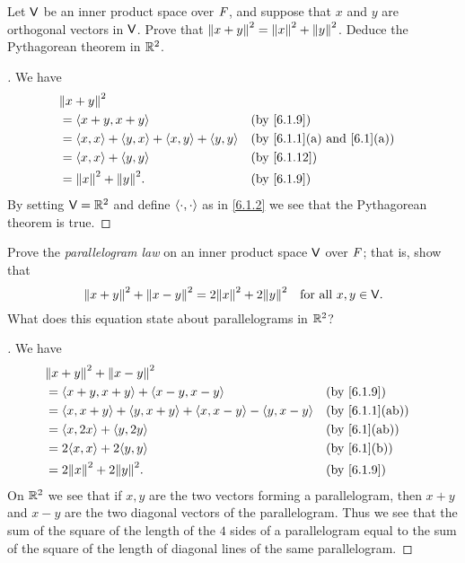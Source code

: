 \begin{ex}\label{ex:6.1.10}
	Let \(\mathsf{V}\) be an inner product space over \(\mathit{F}\), and suppose that \(x\) and \(y\) are orthogonal vectors in \(\mathsf{V}\).
	Prove that \(\left\lVert x + y\right\rVert^2 = \left\lVert x\right\rVert^2 + \left\lVert y\right\rVert^2\).
	Deduce the Pythagorean theorem in \(\mathbb{R}^2\).
\end{ex}

\begin{proof}[]
	We have
	\begin{align*}
		 & \norm{x + y}^2                                                                                         \\
		 & = \inn{x + y, x + y}                                &  & \by{6.1.9}                                    \\
		 & = \inn{x, x} + \inn{y, x} + \inn{x, y} + \inn{y, y} &  & \text{(by \cref{6.1.1}(a) and \cref{6.1}(a))} \\
		 & = \inn{x, x} + \inn{y, y}                           &  & \by{6.1.12}                                   \\
		 & = \norm{x}^2 + \norm{y}^2.                          &  & \by{6.1.9}
	\end{align*}
	By setting \(\mathsf{V} = \mathbb{R}^2\) and define \(\left\langle\cdot, \cdot\right\rangle\) as in \cref{6.1.2} we see that the Pythagorean theorem is true.
\end{proof}

\begin{ex}\label{ex:6.1.11}
	Prove the \emph{parallelogram law} on an inner product space \(\mathsf{V}\) over \(\mathit{F}\);
	that is, show that
	\[
		\norm{x + y}^2 + \norm{x - y}^2 = 2 \norm{x}^2 + 2 \norm{y}^2 \quad \text{for all } x, y \in \V.
	\]
	What does this equation state about parallelograms in \(\mathbb{R}^2\)?
\end{ex}

\begin{proof}[]
	We have
	\begin{align*}
		 & \norm{x + y}^2 + \norm{x - y}^2                                                         \\
		 & = \inn{x + y, x + y} + \inn{x - y, x - y}                           &  & \by{6.1.9}     \\
		 & = \inn{x, x + y} + \inn{y, x + y} + \inn{x, x - y} - \inn{y, x - y} &  & \by{6.1.1}[ab] \\
		 & = \inn{x, 2x} + \inn{y, 2y}                                         &  & \by{6.1}[ab]   \\
		 & = 2 \inn{x, x} + 2 \inn{y, y}                                       &  & \by{6.1}[b]    \\
		 & = 2 \norm{x}^2 + 2 \norm{y}^2.                                      &  & \by{6.1.9}
	\end{align*}
	On \(\mathbb{R}^2\) we see that if \(x, y\) are the two vectors forming a parallelogram, then \(x + y\) and \(x - y\) are the two diagonal vectors of the parallelogram.
	Thus we see that the sum of the square of the length of the \(4\) sides of a parallelogram equal to the sum of the square of the length of diagonal lines of the same parallelogram.
\end{proof}


